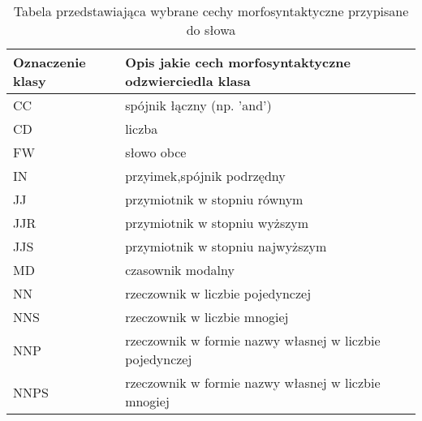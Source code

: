 \begin{table}[!h] \centering
    \caption{Tabela przedstawiająca wybrane cechy morfosyntaktyczne przypisane do słowa}
    \label{tab:klasy_morf} 
    \begin{tabular} {| l | l |} \hline
        Oznaczenie klasy & Opis jakie cech morfosyntaktyczne odzwierciedla klasa   \\ \hline\hline
        CC               & spójnik łączny (np. 'and')                              \\ \hline
        CD               & liczba                                                  \\ \hline
        FW               & słowo obce                                              \\ \hline
        IN               & przyimek,spójnik podrzędny                              \\ \hline
        JJ               & przymiotnik w stopniu równym                            \\ \hline
        JJR              & przymiotnik w stopniu wyższym                           \\ \hline
        JJS              & przymiotnik w stopniu najwyższym                        \\ \hline
        MD               & czasownik modalny                                       \\ \hline
        NN               & rzeczownik w liczbie pojedynczej                        \\ \hline
        NNS              & rzeczownik w liczbie mnogiej                            \\ \hline
        NNP              & rzeczownik w formie nazwy własnej w liczbie pojedynczej \\ \hline
        NNPS             & rzeczownik w formie nazwy własnej w liczbie mnogiej     \\ \hline

\end{tabular}
\end{table}
